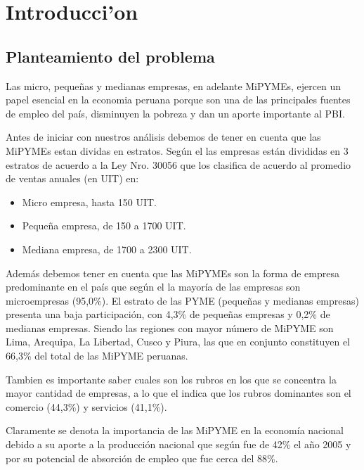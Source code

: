 
\chapter{Introducci'on}

\section{Planteamiento del problema}
Las micro, peque\~nas y medianas empresas, en adelante MiPYMEs, ejercen un papel
esencial en la economia peruana porque son una de las principales fuentes de empleo
del pa\'is, disminuyen la pobreza y dan un aporte importante al PBI.

Antes de iniciar con nuestros an\'alisis debemos de tener en cuenta que las MiPYMEs
estan dividas en estratos. Seg\'un el \cite{produce2} las empresas est\'an divididas en 3 estratos de acuerdo
a la Ley Nro. 30056 que los clasifica de acuerdo al promedio de ventas anuales
(en UIT) en:
\begin{itemize}
  \item Micro empresa, hasta 150 UIT.
  \item Peque\~na empresa, de 150 a 1700 UIT.
  \item Mediana empresa, de 1700 a 2300 UIT.
\end{itemize}

Adem\'as debemos tener en cuenta que las MiPYMEs son la forma de empresa predominante
en el pa\'is que seg\'un el \cite{produce} la mayor\'ia de las empresas son
microempresas (95,0\%). El estrato de las PYME (peque\~nas y medianas empresas) presenta una baja participaci\'on,
con 4,3\% de peque\~nas empresas y 0,2\% de medianas empresas. Siendo las regiones
con mayor n\'umero de MiPYME son Lima, Arequipa, La Libertad, Cusco y Piura, las que
en conjunto constituyen el 66,3\% del total de las MiPYME peruanas.

Tambien es importante saber cuales son los rubros en los que se concentra la mayor cantidad de empresas,
a lo que el \cite{produce} indica que los rubros dominantes son el comercio (44,3\%) y servicios (41,1\%).

Claramente se denota la importancia de las MiPYME en la econom\'ia nacional debido a su aporte a la
producci\'on nacional que seg\'un \citep{arbulu} fue de 42\% el a\~no 2005 y por
su potencial de absorci\'on de empleo que fue cerca del 88\%.


